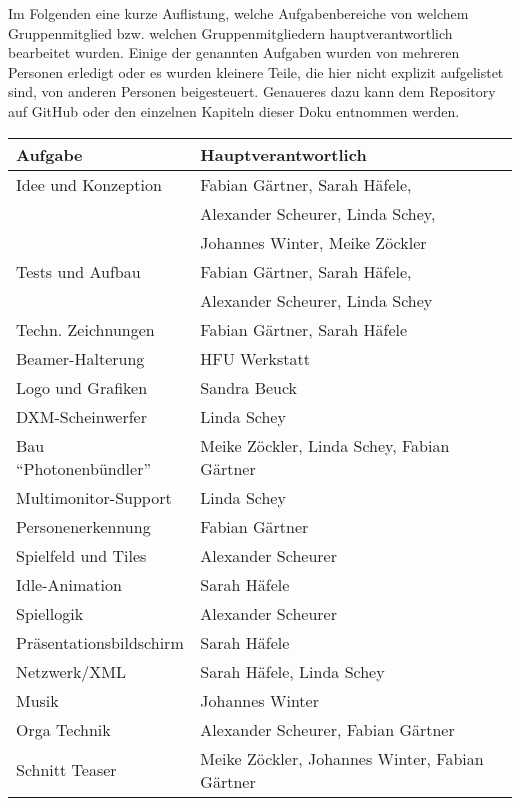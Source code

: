 
Im Folgenden eine kurze Auflistung, welche Aufgabenbereiche von welchem Gruppenmitglied bzw. welchen Gruppenmitgliedern hauptverantwortlich bearbeitet wurden. Einige der genannten Aufgaben wurden von mehreren Personen erledigt oder es wurden kleinere Teile, die hier nicht explizit aufgelistet sind, von anderen Personen beigesteuert. Genaueres dazu kann dem Repository auf GitHub oder den einzelnen Kapiteln dieser Doku entnommen werden.

\begin{center}
\begin{tabular}[hc]{|l|l|}
\hline
\textbf{Aufgabe} & \textbf{Hauptverantwortlich}\\
\hline
Idee und Konzeption& Fabian Gärtner, Sarah Häfele,\\
&Alexander Scheurer, Linda Schey,\\
&Johannes Winter, Meike Zöckler\\
Tests und Aufbau& Fabian Gärtner, Sarah Häfele,\\
&Alexander Scheurer, Linda Schey\\
Techn. Zeichnungen& Fabian Gärtner, Sarah Häfele\\
Beamer-Halterung& HFU Werkstatt\\
Logo und Grafiken& Sandra Beuck\\
DXM-Scheinwerfer&Linda Schey\\
Bau \enquote{Photonenbündler}&Meike Zöckler, Linda Schey, Fabian Gärtner\\
Multimonitor-Support& Linda Schey\\
Personenerkennung& Fabian Gärtner\\
Spielfeld und Tiles& Alexander Scheurer\\
Idle-Animation& Sarah Häfele\\
Spiellogik& Alexander Scheurer\\
Präsentationsbildschirm& Sarah Häfele\\
Netzwerk/XML& Sarah Häfele, Linda Schey\\
Musik& Johannes Winter\\
Orga Technik& Alexander Scheurer, Fabian Gärtner\\
Schnitt Teaser& Meike Zöckler, Johannes Winter, Fabian Gärtner\\
\hline
\end{tabular}
\end{center}